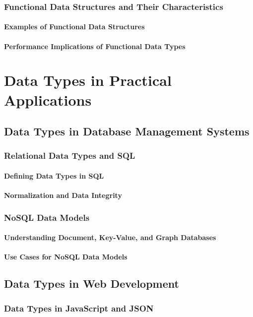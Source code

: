 \documentclass[12pt, oneside]{book}
\begin{document}
\subsection{Functional Data Structures and Their Characteristics}
\subsubsection{Examples of Functional Data Structures}
\subsubsection{Performance Implications of Functional Data Types}

\chapter{Data Types in Practical Applications}
\section{Data Types in Database Management Systems}
\subsection{Relational Data Types and SQL}
\subsubsection{Defining Data Types in SQL}
\subsubsection{Normalization and Data Integrity}
\subsection{NoSQL Data Models}
\subsubsection{Understanding Document, Key-Value, and Graph Databases}
\subsubsection{Use Cases for NoSQL Data Models}
\section{Data Types in Web Development}
\subsection{Data Types in JavaScript and JSON}
\end{document}
